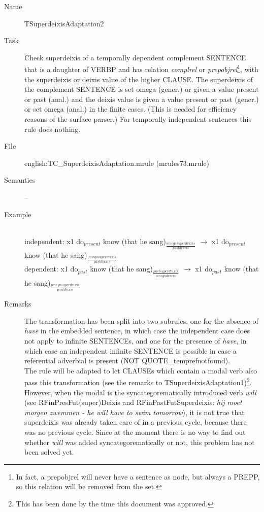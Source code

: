 \begin{description}
\vspace{1 cm}
\begin{description}
\item[Name] TSuperdeixisAdaptation2
\item[Task] 
Check superdeixis of a temporally dependent complement SENTENCE that is a 
daughter of 
VERBP and has relation {\em complrel\/} or {\em 
prepobjrel\/}\footnote{In fact, a 
prepobjrel will never have a sentence as node, but always a PREPP, so this 
relation will be removed from the set.},
 with the superdeixis or 
deixis value of the higher CLAUSE. 
The superdeixis of the complement SENTENCE is set omega (gener.) or given a 
value present or past (anal.) and the deixis value is given a value present or 
past (gener.) or set omega (anal.) in the finite cases. (This is needed for 
efficiency 
reasons of the surface parser.) For temporally independent sentences this rule 
does nothing.
\item[File] english:TC\_SuperdeixisAdaptation.mrule (mrules73.mrule)
\item[Semantics] --
\item[Example] \mbox{}\\
independent: x1 do$_{present}$ know (that he 
sang)$_{\frac{omegasuperdeixis}{pastdeixis}}$ $\rightarrow$
x1 do$_{present}$ know (that he sang)$_{\frac{omegasuperdeixis}{pastdeixis}}$ 
\\
dependent: x1 do$_{past}$ know (that he 
sang)$_{\frac{pastsuperdeixis}{omegadeixis}}$ $\rightarrow$
x1 do$_{past}$ know (that he sang)$_{\frac{omegasuperdeixis}{pastdeixis}}$ 
\item[Remarks] 
The transformation has been split into two subrules, one for the 
absence of {\em have\/} in the embedded sentence, in which case the independent 
case does not apply 
to infinite SENTENCEs, and one for the presence of {\em have\/}, in which 
case an independent infinite SENTENCE is possible in case a referential 
adverbial is present (NOT QUOTE\_temprefnotfound).\\
The rule will be adapted to let CLAUSEs which contain a 
modal verb also pass this transformation (see the remarks to 
TSuperdeixisAdaptation1)\footnote{This has been done by the time this document 
was approved.}. However, when the modal is the syncategorematically 
introduced verb {\em will\/} (see RFinPresFut(super)Deixis and 
RFinPastFutSuperdeixis: {\em hij moet morgen zwemmen - he {\em will} have to 
swim tomorrow\/}), it is not true that superdeixis was already taken care 
of in a previous cycle, because there was no previous cycle. 
Since at the moment there is no way to find out whether 
{\em will\/} was added syncategorematically or not, this problem has not been 
solved yet.
\end{description}


\end{description}
